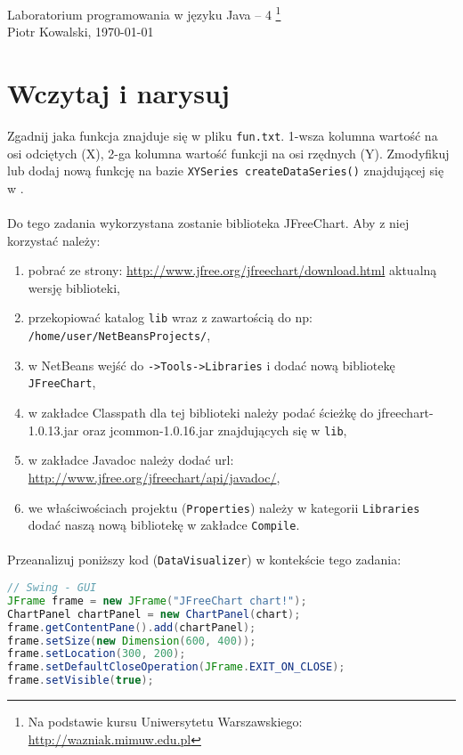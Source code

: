 \documentclass[12pt,letterpaper]{article}
\begin{document}
\linespread{1} %
\small \normalsize %
\begin{flushright}
  Laboratorium programowania w języku Java -- 4 
  \footnote{Na podstawie kursu Uniwersytetu Warszawskiego: \url{http://wazniak.mimuw.edu.pl} }\\
  Piotr Kowalski,
  \today
\end{flushright}

\section{Wczytaj i narysuj}
Zgadnij jaka funkcja znajduje się w pliku \verb+fun.txt+.
1-wsza kolumna wartość na osi odciętych (X), 2-ga kolumna wartość funkcji na
osi rzędnych (Y). Zmodyfikuj lub dodaj nową funkcję na bazie
\verb+XYSeries createDataSeries()+ znajdującej się w .

\paragraph{}

Do tego zadania wykorzystana zostanie biblioteka JFreeChart. Aby z
niej korzystać należy:
\begin{enumerate}
\item pobrać ze strony:
  \url{http://www.jfree.org/jfreechart/download.html} aktualną wersję
  biblioteki,
\item przekopiować katalog \verb+lib+ wraz z zawartością do np:
  \verb+/home/user/NetBeansProjects/+,
\item w NetBeans wejść do \verb+->Tools->Libraries+ i dodać nową
  bibliotekę \verb+JFreeChart+,
\item w zakładce Classpath dla tej biblioteki należy podać ścieżkę do
  jfreechart-1.0.13.jar oraz jcommon-1.0.16.jar znajdujących się w
  \verb+lib+,
\item w zakładce Javadoc należy dodać url:
  \url{http://www.jfree.org/jfreechart/api/javadoc/},
\item we właściwościach projektu (\verb+Properties+) należy w
  kategorii \verb+Libraries+ dodać naszą nową bibliotekę w zakładce \verb+Compile+. 
\end{enumerate}

\paragraph{}
Przeanalizuj poniższy kod (\verb+DataVisualizer+) w kontekście tego
zadania:
\begin{lstlisting}[language=Java]
// Swing - GUI
JFrame frame = new JFrame("JFreeChart chart!");
ChartPanel chartPanel = new ChartPanel(chart);
frame.getContentPane().add(chartPanel);
frame.setSize(new Dimension(600, 400));
frame.setLocation(300, 200);
frame.setDefaultCloseOperation(JFrame.EXIT_ON_CLOSE);
frame.setVisible(true);
\end{lstlisting}
\end{document}
